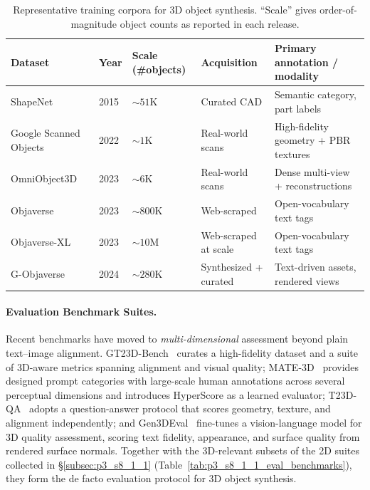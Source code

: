 \begin{table}[t]
    \centering
    \fontsize{8}{10}\selectfont
    \setlength{\tabcolsep}{1.0mm}
    \caption{Representative training corpora for 3D object synthesis. ``Scale'' gives order-of-magnitude object counts as reported in each release.}
    \label{tab:p3_s8_2_1_corpora}
    \begin{tabular}{L{0.22\textwidth} C{0.07\textwidth} C{0.14\textwidth} L{0.20\textwidth} L{0.29\textwidth}}
        \toprule
        \textbf{Dataset} & \textbf{Year} & \textbf{Scale (\#objects)} & \textbf{Acquisition} & \textbf{Primary annotation / modality} \\
        \midrule
        ShapeNet~\cite{shapenet2015} & 2015 & ${\sim}51\mathrm{K}$ & Curated CAD & Semantic category, part labels \\
        Google Scanned Objects~\cite{downs2022googleGSO} & 2022 & ${\sim}1\mathrm{K}$ & Real-world scans & High-fidelity geometry + PBR textures \\
        OmniObject3D~\cite{wu2023omniobject3d} & 2023 & ${\sim}6\mathrm{K}$ & Real-world scans & Dense multi-view + reconstructions \\
        Objaverse~\cite{deitke2023objaverse} & 2023 & ${\sim}800\mathrm{K}$ & Web-scraped & Open-vocabulary text tags \\
        Objaverse-XL~\cite{deitke2023objaversexl} & 2023 & ${\sim}10\mathrm{M}$ & Web-scraped at scale & Open-vocabulary text tags \\
        G-Objaverse~\cite{zuo2024gobjavers} & 2024 & ${\sim}280\mathrm{K}$ & Synthesized + curated & Text-driven assets, rendered views \\
        \bottomrule
    \end{tabular}
\end{table}

\paragraph{Evaluation Benchmark Suites.}
Recent benchmarks have moved to \emph{multi-dimensional} assessment beyond plain text--image alignment.
GT23D-Bench~\cite{cai2024gt23d} curates a high-fidelity dataset and a suite of 3D-aware metrics spanning alignment and visual quality; MATE-3D~\cite{zhang2025mate3d} provides designed prompt categories with large-scale human annotations across several perceptual dimensions and introduces HyperScore as a learned evaluator; T23D-QA~\cite{li2025t23d} adopts a question-answer protocol that scores geometry, texture, and alignment independently; and Gen3DEval~\cite{maiti2025gen3deval} fine-tunes a vision-language model for 3D quality assessment, scoring text fidelity, appearance, and surface quality from rendered surface normals.
Together with the 3D-relevant subsets of the 2D suites collected in §\ref{subsec:p3_s8_1_1} (Table~\ref{tab:p3_s8_1_1_eval_benchmarks}), they form the de facto evaluation protocol for 3D object synthesis.

